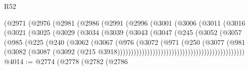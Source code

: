 \begin{lexlean}{R52}
\begin{coremodule}
                            (@2971
                              (@2976
                                (@2981
                                  (@2986
                                    (@2991
                                      (@2996
                                        (@3001
                                          (@3006
                                            (@3011
                                              (@3016
                                                (@3021
                                                  (@3025
                                                    (@3029
                                                      (@3034
                                                        (@3039
                                                          (@3043
                                                            (@3047
                                                              (@245
                                                                (@3052
                                                                  (@3057
                                                                    (@985
                                                                      (@225
                                                                        (@240
                                                                          (@3062
                                                                            (@3067
                                                                              (@976
                                                                                (@3072
                                                                                  (@971
                                                                                    (@250
                                                                                      (@3077
                                                                                        (@981
                                                                                          (@3082
                                                                                            (@3087
                                                                                              (@3092
                                                                                                (@215
                                                                                                  @3918)))))))))))))))))))))))))))))))))))))))))))))))
@4014 := @2774
    (@2778
      (@2782
        (@2786

\end{coremodule}
\end{lexlean}

